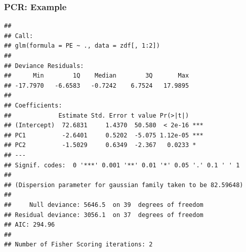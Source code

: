 \documentclass[
  shownotes,
  xcolor={svgnames},
  hyperref={colorlinks,citecolor=DarkBlue,linkcolor=DarkRed,urlcolor=DarkBlue}
  , aspectratio=169]{beamer}
\newenvironment{Shaded}{\begin{snugshade}}{\end{snugshade}}
\newcommand{\AttributeTok}[1]{\textcolor[rgb]{0.77,0.63,0.00}{#1}}
\newcommand{\DecValTok}[1]{\textcolor[rgb]{0.00,0.00,0.81}{#1}}
\newcommand{\FunctionTok}[1]{\textcolor[rgb]{0.00,0.00,0.00}{#1}}
\newcommand{\NormalTok}[1]{#1}
\newcommand{\OtherTok}[1]{\textcolor[rgb]{0.56,0.35,0.01}{#1}}
\newcommand{\SpecialCharTok}[1]{\textcolor[rgb]{0.00,0.00,0.00}{#1}}
\begin{document}
\begin{frame}[fragile]
\frametitle{PCR: Example }
\begin{scriptsize}


\begin{Shaded}
\end{Shaded}
\end{scriptsize}
\begin{tiny}

\begin{verbatim}
## 
## Call:
## glm(formula = PE ~ ., data = zdf[, 1:2])
## 
## Deviance Residuals: 
##      Min        1Q    Median        3Q       Max  
## -17.7970   -6.6583   -0.7242    6.7524   17.9895  
## 
## Coefficients:
##             Estimate Std. Error t value Pr(>|t|)    
## (Intercept)  72.6831     1.4370  50.580  < 2e-16 ***
## PC1          -2.6401     0.5202  -5.075 1.12e-05 ***
## PC2          -1.5029     0.6349  -2.367   0.0233 *  
## ---
## Signif. codes:  0 '***' 0.001 '**' 0.01 '*' 0.05 '.' 0.1 ' ' 1
## 
## (Dispersion parameter for gaussian family taken to be 82.59648)
## 
##     Null deviance: 5646.5  on 39  degrees of freedom
## Residual deviance: 3056.1  on 37  degrees of freedom
## AIC: 294.96
## 
## Number of Fisher Scoring iterations: 2
\end{verbatim}
\end{tiny}
\end{frame}
\end{document}
